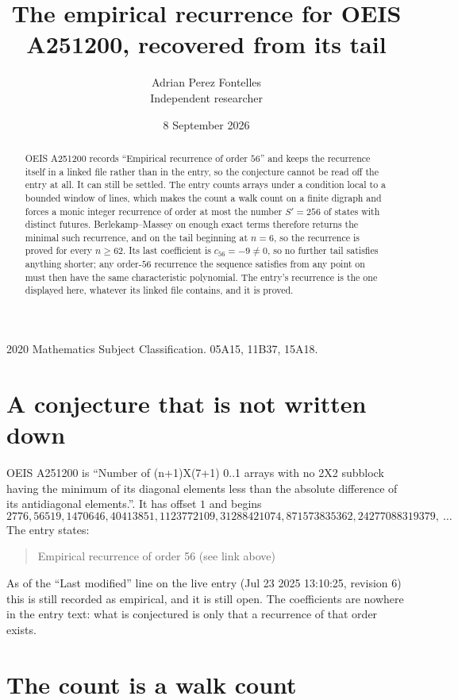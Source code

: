 \documentclass[11pt,a4paper]{article}
\title{The empirical recurrence for OEIS A251200, recovered from its tail}
\author{Adrian Perez Fontelles\\ \small Independent researcher}
\date{8 September 2026}
\theoremstyle{plain}
\theoremstyle{definition}
\begin{document}
\maketitle

\begin{abstract}
OEIS A251200 records ``Empirical recurrence of order $56$'' and keeps the recurrence itself in
a linked file rather than in the entry, so the conjecture cannot be read off the entry at all.
It can still be settled. The entry counts arrays under a condition local to a bounded window of
lines, which makes the count a walk count on a finite digraph and forces a monic integer
recurrence of order at most the number $S'=256$ of states with distinct futures. Berlekamp--Massey on
enough exact terms therefore returns the minimal such recurrence, and on the tail beginning at $n=6$, so the recurrence is proved for every $n\ge62$.
Its last coefficient is $c_{56}=-9\neq0$, so no further tail satisfies anything
shorter; any order-$56$ recurrence the sequence satisfies from any point on must then have
the same characteristic polynomial. The entry's recurrence is the one displayed here, whatever
its linked file contains, and it is proved.
\end{abstract}

\noindent\small 2020 Mathematics Subject Classification. 05A15, 11B37, 15A18.\normalsize

\section{A conjecture that is not written down}

OEIS A251200 is ``Number of (n+1)X(7+1) 0..1 arrays with no 2X2 subblock having the minimum of its diagonal elements less than the absolute difference of its antidiagonal elements.''. It has offset $1$ and begins
\[
2776, 56519, 1470646, 40413851, 1123772109, 31288421074, 871573835362, 24277088319379,\ \dots
\]
The entry states:
\begin{quote}
Empirical recurrence of order 56 (see link above)
\end{quote}
As of the ``Last modified'' line on the live entry (Jul 23 2025 13:10:25, revision 6)
this is still recorded as empirical, and it is still open. The coefficients are nowhere in the
entry text: what is conjectured is only that a recurrence of that order exists.

\section{The count is a walk count}
\end{document}
